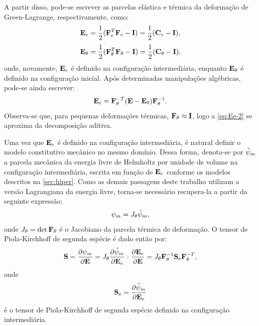 \documentclass[Tese.tex]{subfiles}
\begin{document}

A partir disso, pode-se escrever as parcelas elástica e térmica da deformação de Green-Lagrange, respectivamente, como:
\begin{align}
&\mathbf{E}_e = \dfrac{1}{2}(\mathbf{F}_e^T\mathbf{F}_e-\mathbf{I}) = \dfrac{1}{2}(\mathbf{C}_e-\mathbf{I}) , \label{eq:Ee}\\[0.1cm]
&\mathbf{E}_{\theta} = \dfrac{1}{2}(\mathbf{F}_{\theta}^T\mathbf{F}_{\theta}-\mathbf{I}) = \dfrac{1}{2}(\mathbf{C}_{\theta}-\mathbf{I}) , \label{eq:Et}
\end{align}
onde, novamente, $\mathbf{E}_e$ é definido na configuração intermediária, enquanto $\mathbf{E}_{\theta}$ é definido na configuração inicial. Após determinadas manipulações algébricas, pode-se ainda escrever:
\begin{equation}\label{eq:Ee-2}
\mathbf{E}_e = \mathbf{F}_{\theta}^{-T}(\mathbf{E}-\mathbf{E}_{\theta})\mathbf{F}_{\theta}^{-1}.
\end{equation}
Observa-se que, para pequenas deformações térmicas, $\mathbf{F}_{\theta}\approx\mathbf{I}$, logo a \cref{eq:Ee-2} se aproxima da decomposição aditiva.

Uma vez que $\mathbf{E}_e$ é definido na configuração intermediária, é natural definir o modelo constitutivo mecânico no mesmo domínio. Dessa forma, denota-se por $\tilde{\psi}_m$ a parcela mecânica da energia livre de Helmholtz por unidade de volume na configuração intermediária, escrita em função de $\mathbf{E}_e$ conforme os modelos descritos na \autoref{sec:hiper}. Como as demais passagens deste trabalho utilizam a versão Lagrangiana da energia livre, torna-se necessário recupera-la a partir da seguinte expressão:
\begin{equation}\label{eq:psim-int}
\psi_m = J_{\theta}\tilde{\psi}_m,
\end{equation}
onde $J_{\theta}=\det\mathbf{F}_{\theta}$ é o Jacobiano da parcela térmica de deformação. O tensor de Piola-Kirchhoff de segunda espécie é dado então por:
\begin{equation}\label{eq:S-termo}
\mathbf{S} = \dfrac{\partial\psi_m}{\partial\mathbf{E}} = J_{\theta}\dfrac{\partial\tilde{\psi}_m}{\partial\mathbf{E}_e}:\dfrac{\partial\mathbf{E}_e}{\partial\mathbf{E}} = J_{\theta}\mathbf{F}_{\theta}^{-1}\mathbf{S}_e\mathbf{F}_{\theta}^{-T},
\end{equation}
onde
\begin{equation}
\mathbf{S}_e = \dfrac{\partial\tilde{\psi}_m}{\partial\mathbf{E}_e}
\end{equation}
é o tensor de Piola-Kirchhoff de segunda espécie definido na configuração intermediária.
\end{document}
